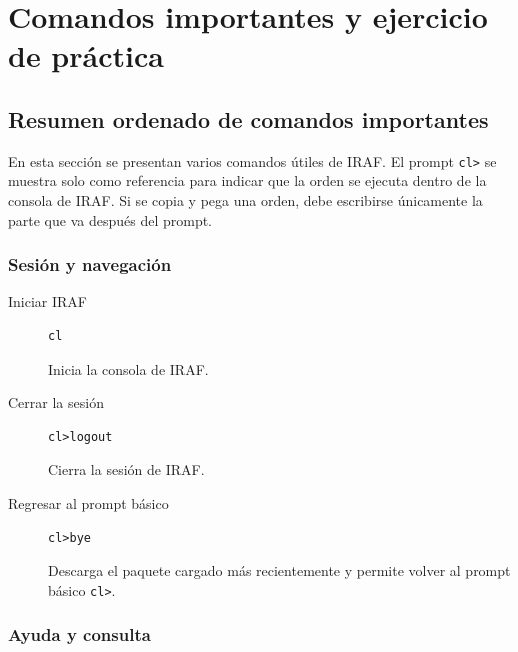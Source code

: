 \section{Comandos importantes y ejercicio de práctica}

\subsection{Resumen ordenado de comandos importantes}

En esta sección se presentan varios comandos útiles de IRAF. El prompt \texttt{cl>} se muestra solo como referencia para indicar que la orden se ejecuta dentro de la consola de IRAF. Si se copia y pega una orden, debe escribirse únicamente la parte que va después del prompt.

\subsubsection*{Sesión y navegación}

\begin{description}

\item[Iniciar IRAF]
\begin{verbatim}
cl
\end{verbatim}
Inicia la consola de IRAF.

\item[Cerrar la sesión]
\begin{verbatim}
cl>logout
\end{verbatim}
Cierra la sesión de IRAF.

\item[Regresar al prompt básico]
\begin{verbatim}
cl>bye
\end{verbatim}
Descarga el paquete cargado más recientemente y permite volver al prompt básico \texttt{cl>}.

\end{description}

\subsubsection*{Ayuda y consulta}

